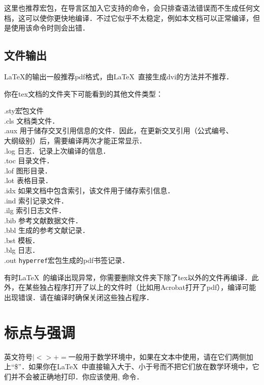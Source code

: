 这里也推荐宏包，在导言区加入它支持的命令，会只排查语法错误而不生成任何文档，这可以使你更快地编译．不过它似乎不太稳定，例如本文档可以正常编译，但是使用该命令时则会出错．

\subsection{文件输出}
\LaTeX{}的输出一般推荐pdf格式，由\LaTeX\ 直接生成dvi的方法并不推荐．

你在tex文档的文件夹下可能看到的其他文件类型：
\begin{tabbing}
	.sty{\hspace{2em}}\=宏包文件\\
	.cls	\> 文档类文件．\\
	.aux    \> 用于储存交叉引用信息的文件．因此，在更新交叉引用（公式编号、\\
	\> 大纲级别）后，需要编译两次才能正常显示．\\
	.log    \> 日志．记录上次编译的信息．\\
	.toc    \> 目录文件．\\
	.lof    \> 图形目录．\\
	.lot    \> 表格目录．\\
	.idx    \> 如果文档中包含索引，该文件用于储存索引信息．\\
	.ind	\> 索引记录文件．\\
	.ilg	\> 索引日志文件．\\
	.bib	\> \bibtex 参考文献数据文件．\\
	.bbl	\> \bibtex 生成的参考文献记录．\\
	.bst	\> \bibtex 模板．\\
	.blg	\> \bibtex 日志．\\
	.out	\> \texttt{hyperref}宏包生成的pdf书签记录．
\end{tabbing}

有时\LaTeX\ 的编译出现异常，你需要删除文件夹下除了tex以外的文件再编译．此外，在某些独占程序打开了以上的文件时（比如用Acrobat打开了pdf），编译可能出现错误．请在编译时确保关闭这些独占程序．

\section{标点与强调}
英文符号$|<>+=$一般用于数学环境中，如果在文本中使用，请在它们两侧加上“\$”．如果你在\LaTeX\ 中直接输入大于、小于号而不把它们放在数学环境中，它们并不会被正确地打印．你应该使用, 命令．

